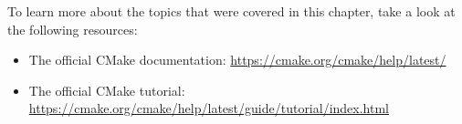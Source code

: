 To learn more about the topics that were covered in this chapter, take a look at the following resources:

\begin{itemize}
\item 
The official CMake documentation: \url{https://cmake.org/cmake/help/latest/}

\item 
The official CMake tutorial: \url{https://cmake.org/cmake/help/latest/guide/tutorial/index.html}
\end{itemize}















